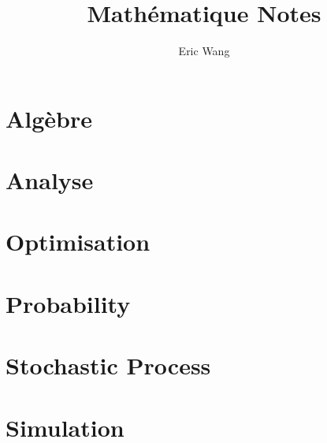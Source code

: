 \documentclass{book}
\begin{document}
\title{Math\'ematique Notes}
\author{Eric Wang}
\maketitle
\newpage
\tableofcontents
\newpage

\part{Alg\`ebre}









\part{Analyse}


\part{Optimisation}



\part{Probability}


\part{Stochastic Process}


\part{Simulation}

\end{document}
